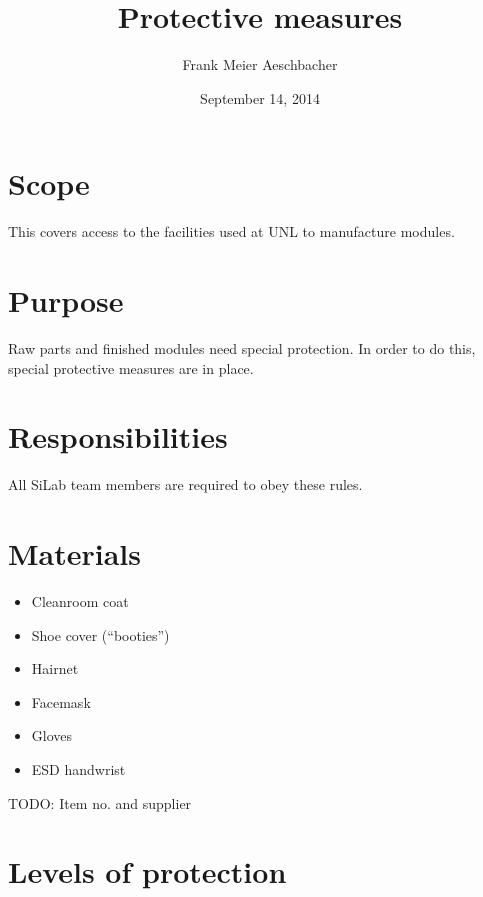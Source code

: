 \documentclass[12pt]{unlsilabsop}
\title{Protective measures}
\date{September 14, 2014}
\author{Frank Meier Aeschbacher}
\begin{document}
\maketitle

\section{Scope}
This covers access to the facilities used at UNL to manufacture modules.

\section{Purpose}
Raw parts and finished modules need special protection. In order to do this, special protective measures are in place.


\section{Responsibilities}
All SiLab team members are required to obey these rules.

\section{Materials}
\begin{itemize}
    \item Cleanroom coat
    \item Shoe cover (``booties'')
    \item Hairnet
    \item Facemask
    \item Gloves
    \item ESD handwrist
\end{itemize}
TODO: Item no. and supplier

\section{Levels of protection}
\end{document}
